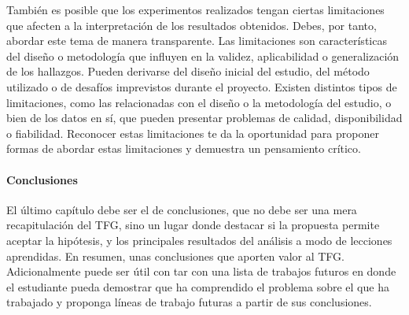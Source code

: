 También es posible que los experimentos realizados tengan ciertas limitaciones que afecten a la interpretación de los resultados obtenidos. Debes, por tanto, abordar este tema de manera transparente. Las limitaciones son características del diseño o metodología que influyen en la validez, aplicabilidad o generalización de los hallazgos. Pueden derivarse del diseño inicial del estudio, del método utilizado o de desafíos imprevistos durante el proyecto. Existen distintos tipos de limitaciones, como las relacionadas con el diseño o la metodología del estudio, o bien de los datos en sí, que pueden presentar problemas de calidad, disponibilidad o fiabilidad. Reconocer estas limitaciones te da la oportunidad para proponer formas de abordar estas limitaciones y demuestra un pensamiento crítico.

\paragraph{Conclusiones} El último capítulo debe ser el de conclusiones, que no debe ser una mera recapitulación del TFG, sino un lugar donde destacar si la propuesta permite aceptar la hipótesis, y los principales resultados del análisis a modo de lecciones aprendidas. En resumen, unas conclusiones que aporten valor al TFG. Adicionalmente puede ser útil con tar con una lista de trabajos futuros en donde el estudiante pueda demostrar que ha comprendido el problema sobre el que ha trabajado y proponga líneas de trabajo futuras a partir de sus conclusiones.



